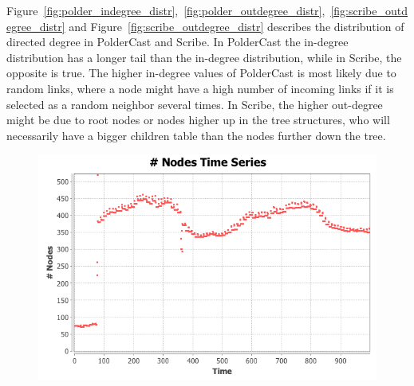 Figure~\ref{fig:polder_indegree_distr},~\ref{fig:polder_outdegree_distr},~\ref{fig:scribe_outdegree_distr}
and Figure~\ref{fig:scribe_outdegree_distr} describes the distribution
of directed degree in PolderCast and Scribe. In PolderCast the in-degree
distribution has a longer tail than the in-degree distribution, while in
Scribe, the opposite is true. The higher in-degree values of PolderCast
is most likely due to random links, where a node might have a high
number of incoming links if it is selected as a random neighbor several
times. In Scribe, the higher out-degree might be due to root nodes or
nodes higher up in the tree structures, who will necessarily have a
bigger children table than the nodes further down the tree.

\begin{figure}[Ht]
    \centering
    \includegraphics[scale=0.5]{plots/polder_nodes_ts}
    \label{fig:polder_node_ts}
\end{figure}

